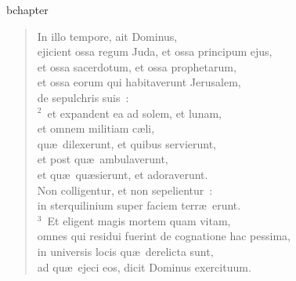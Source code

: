 bchapter\begin{verse}\vspace{-19pt}In illo tempore, ait Dominus,\\ ejicient ossa regum Juda, et ossa principum ejus,\\ et ossa sacerdotum, et ossa prophetarum,\\ et ossa eorum qui habitaverunt Jerusalem,\\ de sepulchris suis~:\\
${}^{2}$~et expandent ea ad solem, et lunam,\\ et omnem militiam c\ae li,\\ qu\ae\ dilexerunt, et quibus servierunt,\\ et post qu\ae\ ambulaverunt,\\ et qu\ae\ qu\ae sierunt, et adoraverunt.\\ Non colligentur, et non sepelientur~:\\ in sterquilinium super faciem terr\ae\ erunt.\\
${}^{3}$~Et eligent magis mortem quam vitam,\\ omnes qui residui fuerint de cognatione hac pessima,\\ in universis locis qu\ae\ derelicta sunt,\\ ad qu\ae\ ejeci eos, dicit Dominus exercituum.\end{verse}


